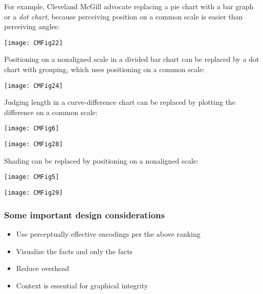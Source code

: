 \documentclass{beamer}
\begin{document}
\begin{frame}
For example, Cleveland McGill advocate replacing a pie chart with a bar graph
or a {\sl dot chart}, because perceiving position on a common scale
is easier than perceiving angles:
\medskip

\texttt{[image: CMFig22]}
\end{frame}

\begin{frame}
Positioning on a nonaligned scale in a divided bar chart can
be replaced by a dot chart with grouping, which uses positioning
on a common scale:
\medskip

\texttt{[image: CMFig24]}
\end{frame}

\begin{frame}
Judging length in a curve-difference chart can be replaced by
plotting the difference on a common scale:

\begin{center}
\texttt{[image: CMFig6]}

\texttt{[image: CMFig28]}
\end{center}
\end{frame}

\begin{frame}
Shading can be replaced by positioning on a nonaligned scale:

\begin{center}
\texttt{[image: CMFig5]}

\texttt{[image: CMFig29]}
\end{center}
\end{frame}

\begin{frame}
\frametitle{Some important design considerations}
\begin{itemize}
\item Use perceptually effective encodings per the above ranking\\
\item Visualize the facts and only the facts\\
\item Reduce overhead
\item Context is essential for graphical integrity
\end{itemize}
\end{frame}
\end{document}
